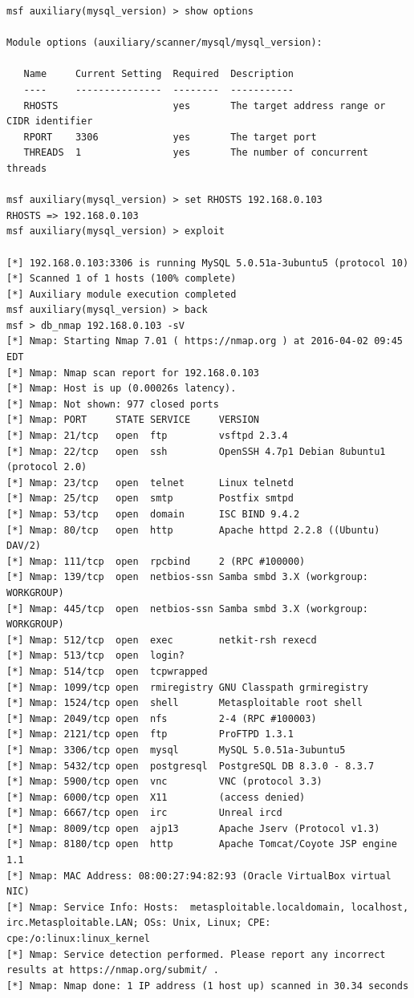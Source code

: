 \documentclass[10pt,a4paper]{report}
\begin{document}
\begin{verbatim}
msf auxiliary(mysql_version) > show options

Module options (auxiliary/scanner/mysql/mysql_version):

   Name     Current Setting  Required  Description
   ----     ---------------  --------  -----------
   RHOSTS                    yes       The target address range or CIDR identifier
   RPORT    3306             yes       The target port
   THREADS  1                yes       The number of concurrent threads

msf auxiliary(mysql_version) > set RHOSTS 192.168.0.103
RHOSTS => 192.168.0.103
msf auxiliary(mysql_version) > exploit

[*] 192.168.0.103:3306 is running MySQL 5.0.51a-3ubuntu5 (protocol 10)
[*] Scanned 1 of 1 hosts (100% complete)
[*] Auxiliary module execution completed
msf auxiliary(mysql_version) > back
msf > db_nmap 192.168.0.103 -sV
[*] Nmap: Starting Nmap 7.01 ( https://nmap.org ) at 2016-04-02 09:45 EDT
[*] Nmap: Nmap scan report for 192.168.0.103
[*] Nmap: Host is up (0.00026s latency).
[*] Nmap: Not shown: 977 closed ports
[*] Nmap: PORT     STATE SERVICE     VERSION
[*] Nmap: 21/tcp   open  ftp         vsftpd 2.3.4
[*] Nmap: 22/tcp   open  ssh         OpenSSH 4.7p1 Debian 8ubuntu1 (protocol 2.0)
[*] Nmap: 23/tcp   open  telnet      Linux telnetd
[*] Nmap: 25/tcp   open  smtp        Postfix smtpd
[*] Nmap: 53/tcp   open  domain      ISC BIND 9.4.2
[*] Nmap: 80/tcp   open  http        Apache httpd 2.2.8 ((Ubuntu) DAV/2)
[*] Nmap: 111/tcp  open  rpcbind     2 (RPC #100000)
[*] Nmap: 139/tcp  open  netbios-ssn Samba smbd 3.X (workgroup: WORKGROUP)
[*] Nmap: 445/tcp  open  netbios-ssn Samba smbd 3.X (workgroup: WORKGROUP)
[*] Nmap: 512/tcp  open  exec        netkit-rsh rexecd
[*] Nmap: 513/tcp  open  login?
[*] Nmap: 514/tcp  open  tcpwrapped
[*] Nmap: 1099/tcp open  rmiregistry GNU Classpath grmiregistry
[*] Nmap: 1524/tcp open  shell       Metasploitable root shell
[*] Nmap: 2049/tcp open  nfs         2-4 (RPC #100003)
[*] Nmap: 2121/tcp open  ftp         ProFTPD 1.3.1
[*] Nmap: 3306/tcp open  mysql       MySQL 5.0.51a-3ubuntu5
[*] Nmap: 5432/tcp open  postgresql  PostgreSQL DB 8.3.0 - 8.3.7
[*] Nmap: 5900/tcp open  vnc         VNC (protocol 3.3)
[*] Nmap: 6000/tcp open  X11         (access denied)
[*] Nmap: 6667/tcp open  irc         Unreal ircd
[*] Nmap: 8009/tcp open  ajp13       Apache Jserv (Protocol v1.3)
[*] Nmap: 8180/tcp open  http        Apache Tomcat/Coyote JSP engine 1.1
[*] Nmap: MAC Address: 08:00:27:94:82:93 (Oracle VirtualBox virtual NIC)
[*] Nmap: Service Info: Hosts:  metasploitable.localdomain, localhost, irc.Metasploitable.LAN; OSs: Unix, Linux; CPE: cpe:/o:linux:linux_kernel
[*] Nmap: Service detection performed. Please report any incorrect results at https://nmap.org/submit/ .
[*] Nmap: Nmap done: 1 IP address (1 host up) scanned in 30.34 seconds
\end{verbatim}
\end{document}
